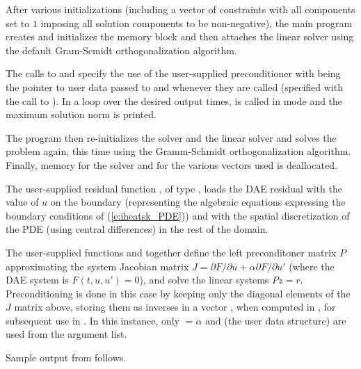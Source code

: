 After various initializations (including a vector of constraints with
all components set to $1$ imposing all solution components to be
non-negative), the main program creates and initializes the {\ida}
memory block and then attaches the {\idaspgmr} linear solver using the
default  Gram-Scmidt orthogonalization algorithm.

The calls to  and 
specify the use of the user-supplied preconditioner with 
being the pointer to user data passed to  and  
whenever they are called (specified with the call to ).
In a loop over the desired output times,  is called in 
mode and the maximum solution norm is printed.

The  program then re-initializes the {\ida} solver and the
{\idaspgmr} linear solver and solves the problem again, this time
using the  Gramm-Schmidt orthogonalization algorithm.
Finally, memory for the {\ida} solver and for the various vectors used is deallocated.

The user-supplied residual function , of type ,
loads the DAE residual with the value of $u$ on the boundary
(representing the algebraic equations expressing the boundary
conditions of (\ref{e:iheatsk_PDE})) and with the spatial discretization 
of the PDE (using central differences) in the rest of the domain.

The user-supplied functions  and  together define the 
left preconditoner matrix $P$ approximating the system Jacobian matrix
$J = \partial F/ \partial u + \alpha \partial F/ \partial u'$ (where the DAE
system is $F(t,u,u') = 0$), and solve the linear systems $P z = r$.   
Preconditioning  is done in this case by keeping only the diagonal elements of 
the $J$ matrix above, storing them as inverses in a vector , when computed
in , for subsequent use in .
In this instance, only  $=\alpha$ and  (the user data
structure) are used from the  argument list.

Sample output from  follows.
